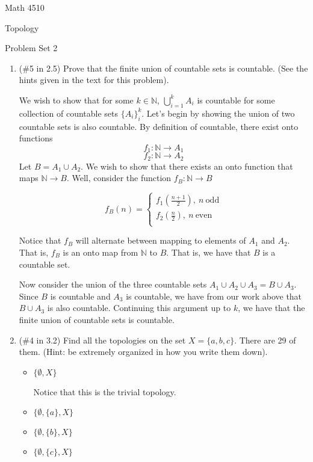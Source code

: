 \documentclass[12pt]{article}
\begin{document}
\noindent Math 4510

\noindent Topology

\vspace{.2in}
\begin{center}
Problem Set 2
\end{center}

 \begin{enumerate}
\item (\#5 in 2.5) Prove that the finite union of countable sets is countable. (See the hints given in the text for this problem).

We wish to show that for some $k \in \mathbb{N}$, $\bigcup_{i=1}^k A_i$ is countable for some collection of countable sets $\{A_i\}_i^k$. Let's begin by showing the union of two countable sets is also countable. By definition of countable, there exist onto functions 
\[f_1 : \mathbb{N} \to A_1\]
\[f_2 : \mathbb{N} \to A_2\]
Let $B = A_1 \cup A_2$. We wish to show that there exists an onto function that maps $\mathbb{N} \to B$. Well, consider the function $f_B: \mathbb{N} \to B$

\[f_B(n) = \begin{cases}
    f_1(\frac{n+1}{2}), \: n\: \text{odd}\\
    f_2(\frac{n}{2}), \: n\: \text{even}\\
\end{cases}\]

Notice that $f_B$ will alternate between mapping to elements of $A_1$ and $A_2$. That is, $f_B$ is an onto map from $\mathbb{N}$ to $B$. That is, we have that $B$ is a countable set.  

Now consider the union of the three countable sets $A_1 \cup A_2 \cup A_3 = B \cup A_3$. Since $B$ is countable and $A_3$ is countable, we have from our work above that $B \cup A_3$ is also countable. Continuing this argument up to $k$, we have that the finite union of countable sets is countable.


\item (\#4 in 3.2) Find all the topologies on the set $X = \{a,b,c\}$. There are 29 of them. (Hint: be extremely organized in how you write them down).
\begin{itemize}
    \item $\{\emptyset, X\}$ 
    
    Notice that this is the trivial topology.
    
    \item $\{\emptyset, \{a\}, X\}$ 
    \item $\{\emptyset, \{b\}, X\}$ 
    \item $\{\emptyset, \{c\}, X\}$ 
    

\end{itemize}
\end{enumerate}
\end{document}
